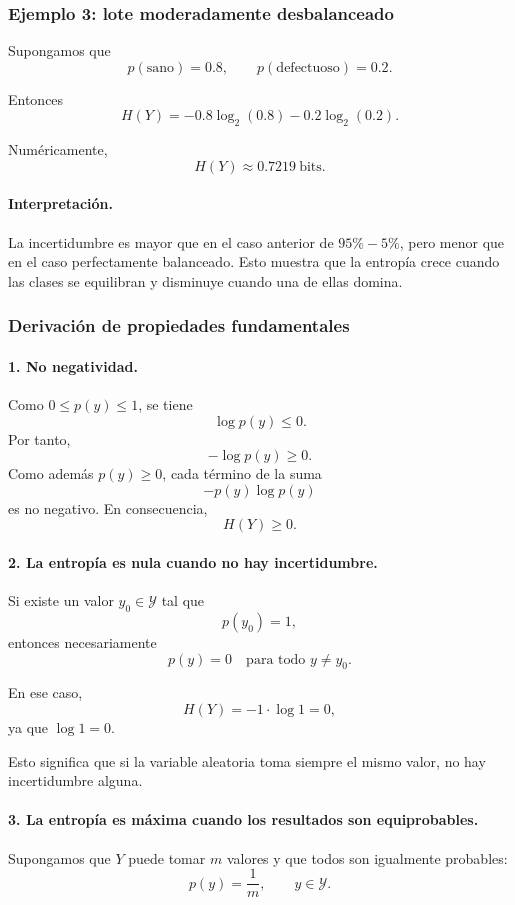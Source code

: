 \documentclass{article}
\begin{document}
\subsubsection*{Ejemplo 3: lote moderadamente desbalanceado}

Supongamos que
\[
p(\text{sano})=0.8,\qquad p(\text{defectuoso})=0.2.
\]

Entonces
\[
H(Y)= -0.8\log_2(0.8)-0.2\log_2(0.2).
\]

Numéricamente,
\[
H(Y)\approx 0.7219\ \text{bits}.
\]

\paragraph{Interpretación.}
La incertidumbre es mayor que en el caso anterior de \(95\%-5\%\), pero menor que en el caso perfectamente balanceado. Esto muestra que la entropía crece cuando las clases se equilibran y disminuye cuando una de ellas domina.

\subsubsection*{Derivación de propiedades fundamentales}

\paragraph{1. No negatividad.}
Como \(0\leq p(y)\leq 1\), se tiene
\[
\log p(y)\leq 0.
\]
Por tanto,
\[
-\log p(y)\geq 0.
\]
Como además \(p(y)\geq 0\), cada término de la suma
\[
-p(y)\log p(y)
\]
es no negativo. En consecuencia,
\[
H(Y)\geq 0.
\]

\paragraph{2. La entropía es nula cuando no hay incertidumbre.}
Si existe un valor \(y_0\in\mathcal{Y}\) tal que
\[
p(y_0)=1,
\]
entonces necesariamente
\[
p(y)=0 \quad \text{para todo } y\neq y_0.
\]

En ese caso,
\[
H(Y)= -1\cdot \log 1 = 0,
\]
ya que \(\log 1=0\).

Esto significa que si la variable aleatoria toma siempre el mismo valor, no hay incertidumbre alguna.

\paragraph{3. La entropía es máxima cuando los resultados son equiprobables.}
Supongamos que \(Y\) puede tomar \(m\) valores y que todos son igualmente probables:
\[
p(y)=\frac{1}{m}, \qquad y\in\mathcal{Y}.
\]
\end{document}
